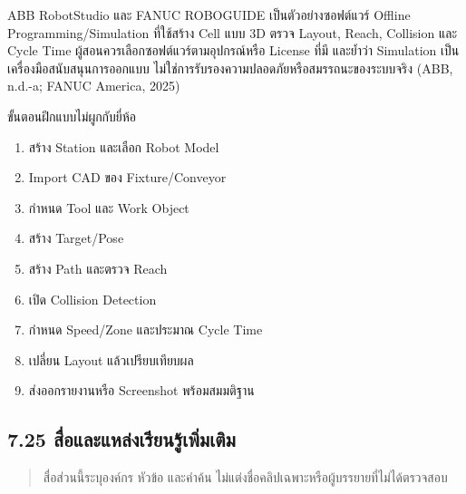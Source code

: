 ABB RobotStudio และ FANUC ROBOGUIDE เป็นตัวอย่างซอฟต์แวร์ Offline Programming/Simulation ที่ใช้สร้าง Cell แบบ 3D ตรวจ Layout, Reach, Collision และ Cycle Time ผู้สอนควรเลือกซอฟต์แวร์ตามอุปกรณ์หรือ License ที่มี และย้ำว่า Simulation เป็นเครื่องมือสนับสนุนการออกแบบ ไม่ใช่การรับรองความปลอดภัยหรือสมรรถนะของระบบจริง (ABB, n.d.-a; FANUC America, 2025)

ขั้นตอนฝึกแบบไม่ผูกกับยี่ห้อ

\begin{enumerate}
    \item สร้าง Station และเลือก Robot Model
    \item Import CAD ของ Fixture/Conveyor
    \item กำหนด Tool และ Work Object
    \item สร้าง Target/Pose
    \item สร้าง Path และตรวจ Reach
    \item เปิด Collision Detection
    \item กำหนด Speed/Zone และประมาณ Cycle Time
    \item เปลี่ยน Layout แล้วเปรียบเทียบผล
    \item ส่งออกรายงานหรือ Screenshot พร้อมสมมติฐาน
\end{enumerate}



\subsection{7.25 สื่อและแหล่งเรียนรู้เพิ่มเติม}

\begin{quote}
สื่อส่วนนี้ระบุองค์กร หัวข้อ และคำค้น ไม่แต่งชื่อคลิปเฉพาะหรือผู้บรรยายที่ไม่ได้ตรวจสอบ
\end{quote}

